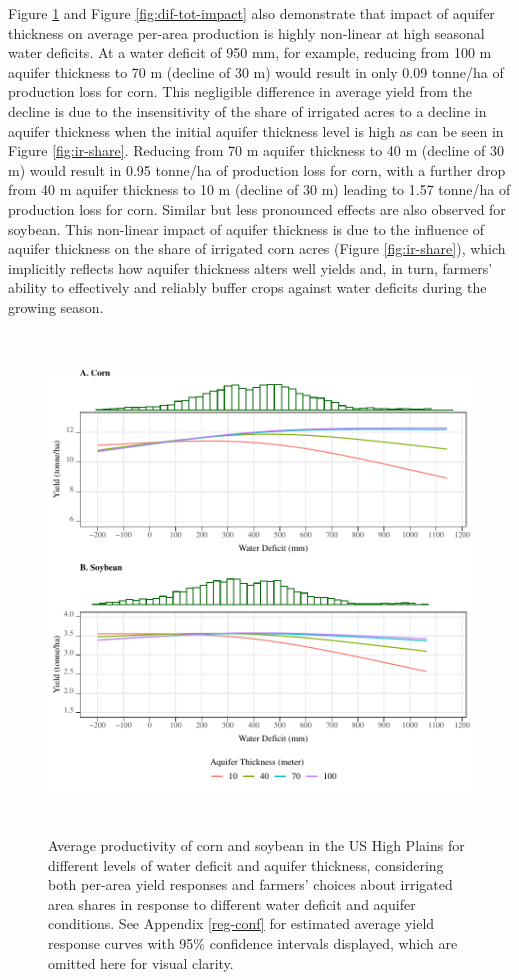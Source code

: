 \documentclass[
]{article}
\begin{document}
Figure \ref{fig:tot-impact} and Figure \ref{fig:dif-tot-impact} also demonstrate that impact of aquifer thickness on average per-area production is highly non-linear at high seasonal water deficits. At a water deficit of 950 mm, for example, reducing from 100 m aquifer thickness to 70 m (decline of 30 m) would result in only 0.09 tonne/ha of production loss for corn. This negligible difference in average yield from the decline is due to the insensitivity of the share of irrigated acres to a decline in aquifer thickness when the initial aquifer thickness level is high as can be seen in Figure \ref{fig:ir-share}. Reducing from 70 m aquifer thickness to 40 m (decline of 30 m) would result in 0.95 tonne/ha of production loss for corn, with a further drop from 40 m aquifer thickness to 10 m (decline of 30 m) leading to 1.57 tonne/ha of production loss for corn. Similar but less pronounced effects are also observed for soybean. This non-linear impact of aquifer thickness is due to the influence of aquifer thickness on the share of irrigated corn acres (Figure \ref{fig:ir-share}), which implicitly reflects how aquifer thickness alters well yields and, in turn, farmers' ability to effectively and reliably buffer crops against water deficits during the growing season.  

\begin{figure}[H]

{\centering \includegraphics[width=6in,height=500px,]{../../Figures/g_total_impact} 

}

\caption{Average productivity of corn and soybean in the US High Plains for different levels of water deficit and aquifer thickness, considering both per-area yield responses and farmers' choices about irrigated area shares in response to different water deficit and aquifer conditions. See Appendix \ref{reg-conf} for estimated average yield response curves with 95\% confidence intervals displayed, which are omitted here for visual clarity.}\label{fig:tot-impact}
\end{figure}
\end{document}
